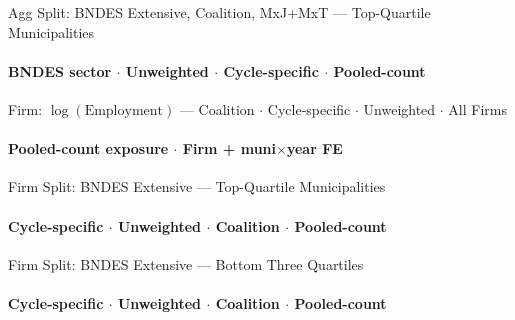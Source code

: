 \documentclass[aspectratio=169,10pt]{beamer}
\newcommand{\tfirm}{../tables/firm}
\newcommand{\tbndes}{../tables/agg_firm_bndes_sector}
\begin{document}

\begin{frame}[t,shrink=12]{Agg Split: BNDES Extensive, Coalition, MxJ+MxT --- Top-Quartile Municipalities}
\framesubtitle{BNDES sector $\cdot$ Unweighted $\cdot$ Cycle-specific $\cdot$ Pooled-count}
\begin{center}\footnotesize

\end{center}
\end{frame}


\begin{frame}[t,shrink=12]{Firm: $\log(\text{Employment})$ --- Coalition $\cdot$ Cycle-specific $\cdot$ Unweighted $\cdot$ All Firms}
\framesubtitle{Pooled-count exposure $\cdot$ Firm + muni$\times$year FE}
\begin{center}\footnotesize

\end{center}
\end{frame}


\begin{frame}[t,shrink=12]{Firm Split: BNDES Extensive --- Top-Quartile Municipalities}
\framesubtitle{Cycle-specific $\cdot$ Unweighted $\cdot$ Coalition $\cdot$ Pooled-count}
\begin{center}\footnotesize

\end{center}
\end{frame}

\begin{frame}[t,shrink=12]{Firm Split: BNDES Extensive --- Bottom Three Quartiles}
\framesubtitle{Cycle-specific $\cdot$ Unweighted $\cdot$ Coalition $\cdot$ Pooled-count}
\begin{center}\footnotesize

\end{center}
\end{frame}

\end{document}
